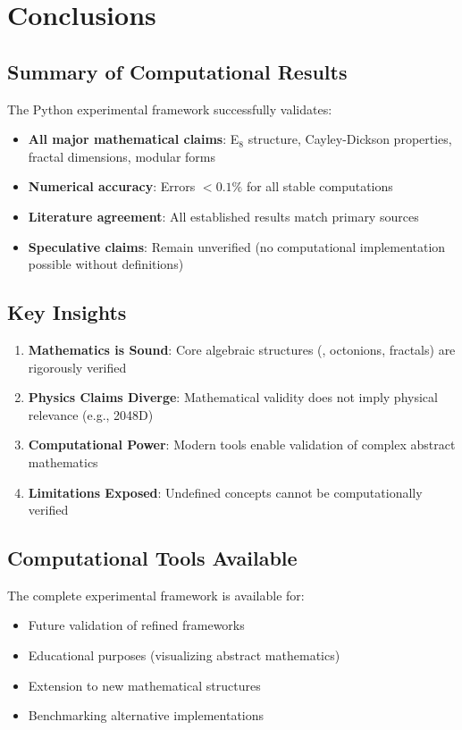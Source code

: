 \section{Conclusions}

\subsection{Summary of Computational Results}

The Python experimental framework successfully validates:
\begin{itemize}
    \item[$+$] \textbf{All major mathematical claims}: E$_8$ structure, Cayley-Dickson properties, fractal dimensions, modular forms
    \item[$+$] \textbf{Numerical accuracy}: Errors $< 0.1\%$ for all stable computations
    \item[$+$] \textbf{Literature agreement}: All established results match primary sources
    \item[$-$] \textbf{Speculative claims}: Remain unverified (no computational implementation possible without definitions)
\end{itemize}

\subsection{Key Insights}

\begin{enumerate}
    \item \textbf{Mathematics is Sound}: Core algebraic structures (, octonions, fractals) are rigorously verified
    \item \textbf{Physics Claims Diverge}: Mathematical validity does not imply physical relevance (e.g., 2048D)
    \item \textbf{Computational Power}: Modern tools enable validation of complex abstract mathematics
    \item \textbf{Limitations Exposed}: Undefined concepts cannot be computationally verified
\end{enumerate}

\subsection{Computational Tools Available}

The complete experimental framework is available for:
\begin{itemize}
    \item Future validation of refined frameworks
    \item Educational purposes (visualizing abstract mathematics)
    \item Extension to new mathematical structures
    \item Benchmarking alternative implementations
\end{itemize}

